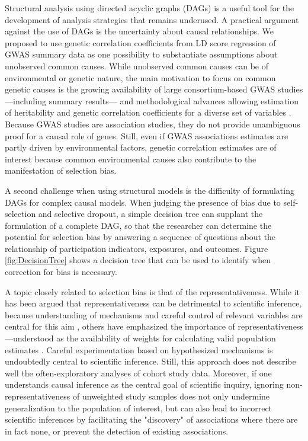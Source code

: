 \documentclass[]{article}
\begin{document}
Structural analysis using directed acyclic graphs (DAGs) is a useful tool for the development of analysis strategies that remains underused. A practical argument against the use of DAGs is the uncertainty about causal relationships. We proposed to use genetic correlation coefficients from LD score regression of GWAS summary data as one possibility to substantiate assumptions about unobserved common causes. While unobserved common causes can be of environmental or genetic nature, the main motivation to focus on common genetic causes is the growing availability of large consortium-based GWAS studies---including summary results--- and methodological advances allowing estimation of heritability and genetic correlation coefficients for a diverse set of variables \supercite{Bulik-Sullivan2015-er, Bulik-Sullivan2015-xn}. Because GWAS studies are association studies, they do not provide unambiguous proof for a causal role of genes. Still, even if GWAS associations estimates are partly driven by environmental factors, genetic correlation estimates are of interest because common environmental causes also contribute to the manifestation of selection bias.


A second challenge when using structural models is the difficulty of formulating DAGs for complex causal models\supercite{Shrier2008-vr}. When judging the presence of bias due to self-selection and selective dropout, a simple decision tree can supplant the formulation of a complete DAG, so that the researcher can determine the potential for selection bias by answering a sequence of questions about the relationship of participation indicators, exposures, and outcomes. Figure \ref{fig:DecisionTree} shows a decision tree that can be used to identify when correction for bias is necessary. 

A topic closely related to selection bias is that of the representativeness. While it has been argued that representativeness can be detrimental to scientific inference, because understanding of mechanisms and careful control of relevant variables are central for this aim \supercite{Rothman2013-qc}, others have emphasized the importance of representativeness---understood as the availability of weights for calculating valid population estimates \supercite{Keiding2016-fv}. Careful experimentation based on hypothesized mechanisms is undoubtedly central to scientific inference. Still, this approach does not describe well the often-exploratory analyses of cohort study data. Moreover, if one understands causal inference as the central goal of scientific inquiry, ignoring non-representativeness of unweighted study samples does not only undermine generalization to the population of interest, but can also lead to incorrect scientific inferences by facilitating the "discovery" of associations where there are in fact none, or prevent the detection of existing associations.
\end{document}
